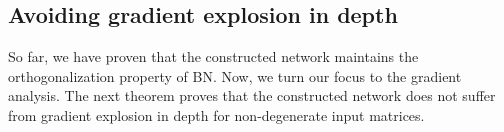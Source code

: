 


\subsection{Avoiding gradient explosion in depth}
\label{grad:sec:explosion}
So far, we have proven that the constructed network maintains the orthogonalization property of BN. Now, we turn our focus to the gradient analysis. The next theorem proves that the constructed network does not suffer from gradient explosion in depth for non-degenerate input matrices. 

